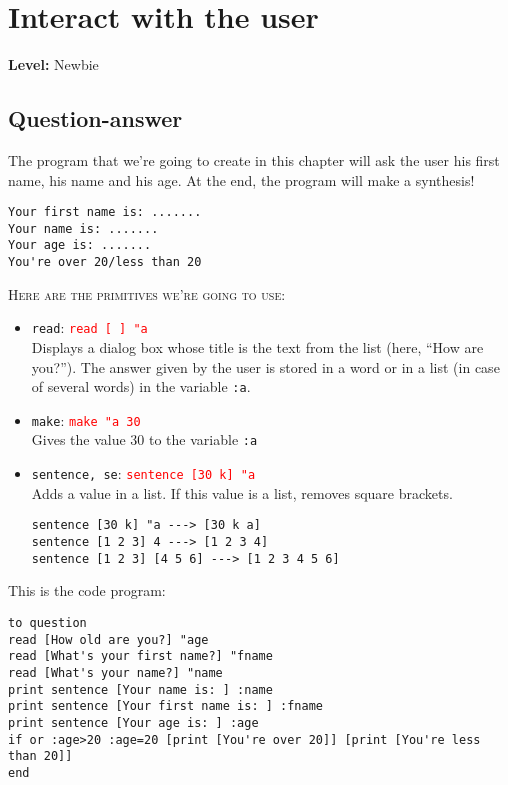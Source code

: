 \chapter{Interact with the user}
{ }\hfill\textbf{Level:} Newbie
\section{Question-answer}
\noindent The program that we're going to create in this chapter will ask the user his first name, his name and his age. At the end, the program will make a synthesis!
\begin{verbatim}
Your first name is: .......
Your name is: .......
Your age is: .......
You're over 20/less than 20
\end{verbatim}
\noindent \textsc{Here are the primitives we're going to use:}  \\
\begin{itemize}
\item \texttt{read}:\hspace{4cm}  \textcolor{red}{ \texttt{read [ ] "a}}\\
Displays a dialog box whose title is the text from the list (here, ``How are you?'').  The answer given by the user is stored in a word or in a list (in case of several words) in the variable \texttt{:a}.
\item \texttt{make}:\hspace{4cm}  \textcolor{red}{ \texttt{make "a 30}}\\
Gives the value 30 to the variable \texttt{:a}
\item \texttt{sentence, se}:\hspace{4cm}  \textcolor{red}{ \texttt{sentence [30 k] "a }}\\
Adds a value in a list. If this value is a list, removes square brackets.
\begin{verbatim}
sentence [30 k] "a ---> [30 k a]
sentence [1 2 3] 4 ---> [1 2 3 4]
sentence [1 2 3] [4 5 6] ---> [1 2 3 4 5 6]
\end{verbatim} 
\end{itemize}
This is the code program:
\begin{verbatim}
to question
read [How old are you?] "age
read [What's your first name?] "fname
read [What's your name?] "name
print sentence [Your name is: ] :name
print sentence [Your first name is: ] :fname
print sentence [Your age is: ] :age
if or :age>20 :age=20 [print [You're over 20]] [print [You're less than 20]]
end
\end{verbatim}
